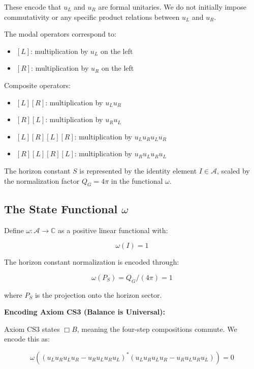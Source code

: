 \documentclass[11pt,a4paper]{article}
\theoremstyle{definition}
\theoremstyle{remark}
\begin{document}
These encode that $u_L$ and $u_R$ are formal unitaries. We do not initially impose commutativity or any specific product relations between $u_L$ and $u_R$.

The modal operators correspond to:
\begin{itemize}
\item $[L]$: multiplication by $u_L$ on the left
\item $[R]$: multiplication by $u_R$ on the left
\end{itemize}

Composite operators:
\begin{itemize}
\item $[L][R]$: multiplication by $u_L u_R$
\item $[R][L]$: multiplication by $u_R u_L$
\item $[L][R][L][R]$: multiplication by $u_L u_R u_L u_R$
\item $[R][L][R][L]$: multiplication by $u_R u_L u_R u_L$
\end{itemize}

The horizon constant $S$ is represented by the identity element $I \in \mathcal{A}$, scaled by the normalization factor $Q_G = 4\pi$ in the functional $\omega$.

\subsection{The State Functional $\omega$}

Define $\omega: \mathcal{A} \to \mathbb{C}$ as a positive linear functional with:

\begin{equation}
\omega(I) = 1
\end{equation}

The horizon constant normalization is encoded through:

\begin{equation}
\omega(P_S) = Q_G/(4\pi) = 1
\end{equation}

where $P_S$ is the projection onto the horizon sector.

\textbf{Encoding Axiom CS3 (Balance is Universal):}

Axiom CS3 states $\Box B$, meaning the four-step compositions commute. We encode this as:

\begin{equation}
\omega((u_L u_R u_L u_R - u_R u_L u_R u_L)^* (u_L u_R u_L u_R - u_R u_L u_R u_L)) = 0
\end{equation}
\end{document}

